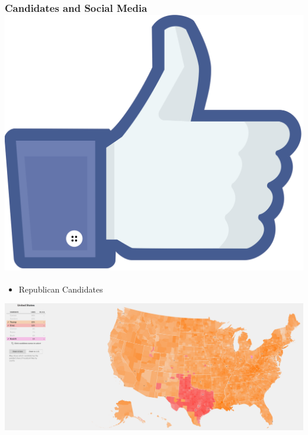 \documentclass[xcolor=dvipsnames]{beamer}
\begin{document}
\begin{frame}
\frametitle{Candidates and Social Media  \hfill  \includegraphics[scale=.015]{images/likes.png}}

\begin{itemize}
\item Republican Candidates 
\end{itemize}
\begin{center}

\includegraphics[scale=.14]{repmap.png}
\end{center}
\end{frame}
\end{document}
